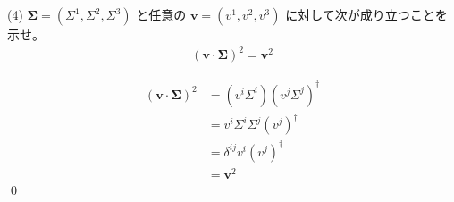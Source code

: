 \documentclass[uplatex,dvipdfmx,a4paper,11pt]{jlreq}
\makeatletter
\numberwithin{equation}{section}
\theoremstyle{definition}
\renewenvironment{proof}[1][\proofname]{\par
  \normalfont
  \topsep6\p@\@plus6\p@ \trivlist
  \item[\hskip\labelsep{\bfseries #1}\@addpunct{\bfseries}]\ignorespaces\quad\par
}{%
  \qed\endtrivlist\@endpefalse
}
\renewcommand\proofname{証明}
\makeatother
\begin{document}
(4) $\bm{\Sigma} = (\Sigma^1, \Sigma^2, \Sigma^3)$ と任意の $\bm{v} = (v^1, v^2, v^3)$ に対して次が成り立つことを示せ。
\begin{align}
  (\bm{v}\cdot\bm{\Sigma})^2 = \bm{v}^2
\end{align}
\begin{proof}
  \begin{align}
    (\bm{v}\cdot\bm{\Sigma})^2 & = (v^i\Sigma^i)(v^j\Sigma^j)^\dagger \\
                               & = v^i\Sigma^i\Sigma^j(v^j)^\dagger   \\
                               & = \delta^{ij}v^i(v^j)^\dagger        \\
                               & = \bm{v}^2
  \end{align}
\end{proof}
\end{document}
